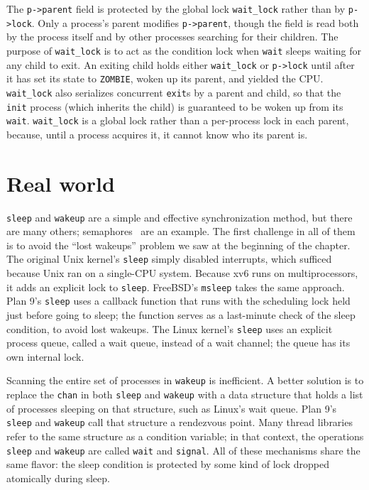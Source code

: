 The \lstinline{p->parent} field is protected by the global lock
\lstinline{wait_lock} rather than by \lstinline{p->lock}.
Only a process's parent modifies \lstinline{p->parent}, though
the field is read both by the process itself and by other
processes searching for their children. The purpose of 
\lstinline{wait_lock} is to act as the condition lock when
\lstinline{wait} sleeps waiting for any child to exit. An
exiting child holds either \lstinline{wait_lock} or \lstinline{p->lock}
until after it has set its state to \lstinline{ZOMBIE}, woken
up its parent, and yielded the CPU. \lstinline{wait_lock} also
serializes concurrent \lstinline{exit}s by a parent and child,
so that the \lstinline{init} process (which inherits the child)
is guaranteed to be woken up from its \lstinline{wait}.
\lstinline{wait_lock} is a global lock rather than a per-process
lock in each parent, because, until a process acquires it,
it cannot know who its parent is.

\section{Real world}

\lstinline{sleep}
and
\lstinline{wakeup}
are a simple and effective synchronization method,
but there are many others;
semaphores~\cite{dijkstra65} are an example.
The first challenge in all of them is to
avoid the ``lost wakeups'' problem we saw at the
beginning of the chapter.
The original Unix kernel's
\lstinline{sleep}
simply disabled interrupts,
which sufficed because Unix ran on a single-CPU system.
Because xv6 runs on multiprocessors,
it adds an explicit lock to
\lstinline{sleep}.
FreeBSD's
\lstinline{msleep}
takes the same approach.
Plan 9's 
\lstinline{sleep}
uses a callback function that runs with the scheduling
lock held just before going to sleep;
the function serves as a last-minute check
of the sleep condition, to avoid lost wakeups.
The Linux kernel's
\lstinline{sleep}
uses an explicit process queue, called a wait queue, instead of
a wait channel; the queue has its own internal lock.

Scanning the entire set of processes in
\lstinline{wakeup}
is inefficient.  A better solution is to
replace the
\lstinline{chan}
in both
\lstinline{sleep}
and
\lstinline{wakeup}
with a data structure that holds
a list of processes sleeping on that structure,
such as Linux's wait queue.
Plan 9's
\lstinline{sleep}
and
\lstinline{wakeup}
call that structure a rendezvous point.
Many thread libraries refer to the same
structure as a condition variable;
in that context, the operations
\lstinline{sleep}
and
\lstinline{wakeup}
are called
\lstinline{wait}
and
\lstinline{signal}.
All of these mechanisms share the same
flavor: the sleep condition is protected by
some kind of lock dropped atomically during sleep.

